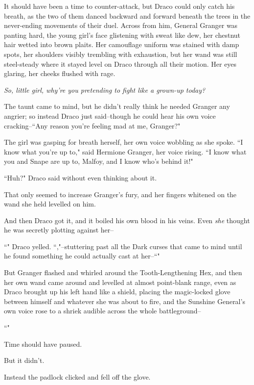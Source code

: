 It should have been a time to counter-attack, but Draco could only catch his breath, as the two of them danced backward and forward beneath the trees in the never-ending movements of their duel. Across from him, General Granger was panting hard, the young girl's face glistening with sweat like dew, her chestnut hair wetted into brown plaits. Her camouflage uniform was stained with damp spots, her shoulders visibly trembling with exhaustion, but her wand was still steel-steady where it stayed level on Draco through all their motion. Her eyes glaring, her cheeks flushed with rage.

\emph{So, little girl, why're you pretending to fight like a grown-up today?}

The taunt came to mind, but he didn't really think he needed Granger any angrier; so instead Draco just said\---though he could hear his own voice cracking\---``Any reason you're feeling mad at me, Granger?"

The girl was gasping for breath herself, her own voice wobbling as she spoke. ``I know what you're up to," said Hermione Granger, her voice rising. ``I know what you and Snape are up to, Malfoy, and I know who's behind it!"

``Huh?" Draco said without even thinking about it.

That only seemed to increase Granger's fury, and her fingers whitened on the wand she held levelled on him.

And then Draco got it, and it boiled his own blood in his veins. Even \emph{she} thought he was secretly plotting against her\---

``" Draco yelled. ``,"\---stuttering past all the Dark curses that came to mind until he found something he could actually cast at her\---``"

But Granger flashed and whirled around the Tooth-Lengthening Hex, and then her own wand came around and levelled at almost point-blank range, even as Draco brought up his left hand like a shield, placing the magic-locked glove between himself and whatever she was about to fire, and the Sunshine General's own voice rose to a shriek audible across the whole battleground\---

``"

Time should have paused.

But it didn't.

Instead the padlock clicked and fell off the glove.

